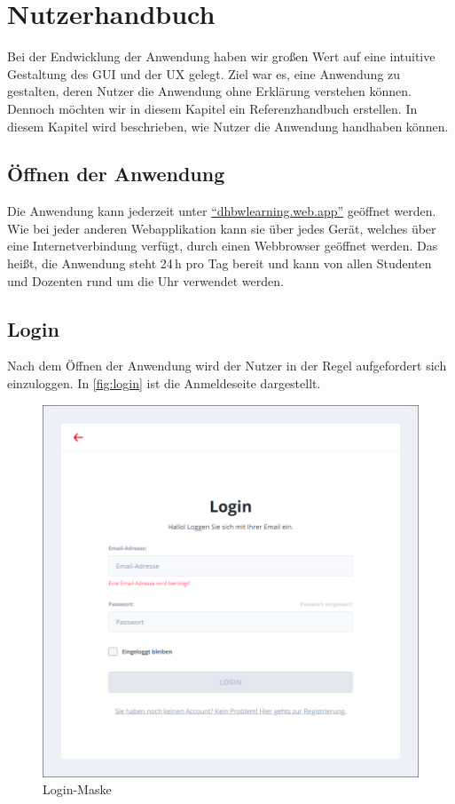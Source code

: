 \chapter{Nutzerhandbuch} 
Bei der Endwicklung der Anwendung haben wir großen Wert auf eine intuitive Gestaltung des \ac{GUI} und der \ac{UX} gelegt. Ziel war es, eine Anwendung zu gestalten, deren Nutzer die Anwendung ohne Erklärung verstehen können.
Dennoch möchten wir in diesem Kapitel ein Referenzhandbuch erstellen.
In diesem Kapitel wird beschrieben, wie Nutzer die Anwendung handhaben können.

\section{Öffnen der Anwendung}
Die Anwendung kann jederzeit unter \href{https://dhbwlearning.web.app}{\enquote{dhbwlearning.web.app}} geöffnet werden.
Wie bei jeder anderen Webapplikation kann sie über jedes Gerät, welches über eine Internetverbindung verfügt, durch einen Webbrowser geöffnet werden. Das heißt, die Anwendung steht 24\,h pro Tag bereit und kann von allen Studenten und Dozenten rund um die Uhr verwendet werden.

\section{Login}
Nach dem Öffnen der Anwendung wird der Nutzer in der Regel aufgefordert sich einzuloggen.
In \autoref{fig:login} ist die Anmeldeseite dargestellt.

\begin{figure}[h]
    \centering
    \includegraphics[width=.7\textwidth]{img/Login.png}
    \caption{Login-Maske}
    \label{fig:login}
\end{figure}

